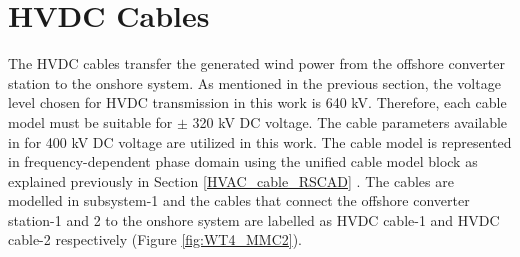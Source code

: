 \section{\gls{HVDC} Cables}
The \gls{HVDC} cables transfer the generated wind power from the offshore converter station to the onshore system. As mentioned in the previous section, the voltage level chosen for \gls{HVDC} transmission in this work is 640 kV. Therefore, each cable model must be suitable for $\pm$ 320 kV \gls{DC} voltage. The cable parameters available in \cite{vrana2013cigre} for 400 kV \gls{DC} voltage are utilized in this work. The cable model is represented in frequency-dependent phase domain using the unified cable model block as explained previously in Section \ref{HVAC_cable_RSCAD} \cite{rtds_tech}. The cables are modelled in subsystem-1 and the cables that connect the offshore converter station-1 and 2 to the onshore system are labelled as \gls{HVDC} cable-1 and \gls{HVDC} cable-2 respectively (Figure \ref{fig:WT4_MMC2}). 

